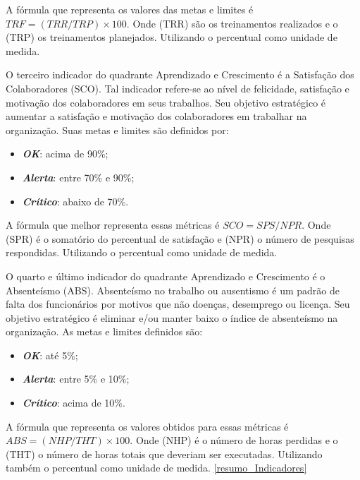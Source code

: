 \documentclass[
	12pt,				%
	openright,			%
	oneside,			%
	a4paper,			%
	english,			%
	brazil				%
	]{abntex2}
\begin{document}
A fórmula que representa os valores das metas e limites é $TRF = (TRR/TRP) 	\times 100$. Onde (TRR) são os treinamentos realizados e o (TRP) os treinamentos planejados. Utilizando o percentual como unidade de medida.

O terceiro indicador do quadrante Aprendizado e Crescimento é a Satisfação dos Colaboradores (SCO). Tal indicador refere-se ao nível de felicidade, satisfação e motivação dos colaboradores em seus trabalhos. Seu objetivo estratégico é aumentar a satisfação e motivação dos colaboradores em trabalhar na organização. Suas metas e limites são definidos por: 
\begin{itemize}
\item  \textbf{\textit{OK}}: acima de 90\%;
\item  \textbf{\textit{Alerta}}: entre 70\% e 90\%;
\item  \textbf{\textit{Crítico}}: abaixo de 70\%.
\end{itemize}

A fórmula que melhor representa essas métricas é $SCO = SPS/NPR$. Onde (SPR) é o somatório do percentual de satisfação e (NPR) o número de pesquisas respondidas. Utilizando o percentual como unidade de medida.

O quarto e último indicador do quadrante Aprendizado e Crescimento é o Absenteísmo (ABS). Absenteísmo no trabalho ou ausentismo é um padrão de falta dos funcionários por motivos que não doenças, desemprego ou licença. Seu objetivo estratégico é eliminar e/ou manter baixo o índice de absenteísmo na organização. As metas e limites definidos são:
\begin{itemize}
\item  \textbf{\textit{OK}}: até 5\%;
\item  \textbf{\textit{Alerta}}: entre 5\% e 10\%;
\item  \textbf{\textit{Crítico}}: acima de 10\%.
\end{itemize}

A fórmula que representa os valores obtidos para essas métricas é $ABS = (NHP/THT) 	\times 100$. Onde (NHP) é o número de horas perdidas e o (THT) o número de horas totais que deveriam ser executadas. Utilizando também o percentual como unidade de medida.
\autoref{resumo_Indicadores}
\end{document}
